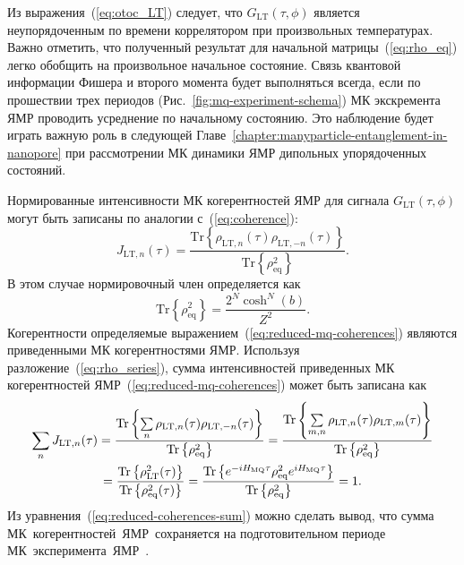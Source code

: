 %
Из выражения~(\ref{eq:otoc_LT}) следует,
что $G_\mathrm{LT}(\tau, \phi)$ является неупорядоченным по времени коррелятором при произвольных температурах.
Важно отметить,
что полученный результат для начальной матрицы~(\ref{eq:rho_eq}) легко обобщить
на произвольное начальное состояние.
Связь квантовой информации Фишера и второго момента будет выполняться всегда,
если по прошествии трех периодов (Рис.~\ref{fig:mq-experiment-schema}) МК экскремента ЯМР
проводить усреднение по начальному состоянию.
Это наблюдение будет играть важную роль в следующей Главе~\ref{chapter:manyparticle-entanglement-in-nanopore}
при рассмотрении МК динамики ЯМР дипольных упорядоченных состояний.

Нормированные интенсивности МК когерентностей ЯМР для сигнала $G_\mathrm{LT}(\tau, \phi)$
могут быть записаны по аналогии с~(\ref{eq:coherence}):
%
\begin{equation}\label{eq:reduced-mq-coherences}
    J_{\mathrm{LT}, n}(\tau) =
    \frac{\mathrm{Tr} \left\{
        \rho_{\mathrm{LT},n}(\tau)
        \rho_{\mathrm{LT}, -n}(\tau)
    \right\}}
    {\mathrm{Tr}\left\{\rho^2_\mathrm{eq}\right\}}.
\end{equation}
%
В этом случае нормировочный член определяется как
%
\begin{equation}\label{eq:j_lt_norm}
  \mathrm{Tr}\left\{\rho^2_\mathrm{eq}\right\} =
    \frac{2^N \cosh^N(b)}{Z^2}.
\end{equation}
Когерентности определяемые выражением~(\ref{eq:reduced-mq-coherences})
являются приведенными МК когерентностями ЯМР.
%
Используя разложение~(\ref{eq:rho_series}),
сумма интенсивностей приведенных МК когерентностей ЯМР~(\ref{eq:reduced-mq-coherences}) может быть записана как
%
\begin{multline}\label{eq:reduced-coherences-sum}
  \sum\limits_{n} J_{\mathrm{LT}, n}(\tau)
  = \dfrac{
    \mathrm{Tr} \left\{ 
      \sum\limits_{n}
      \rho_{\mathrm{LT}, n}(\tau)
      \rho_{\mathrm{LT},-n}(\tau) \right\}
    }{
    \mathrm{Tr} \left\{ \rho^2_\mathrm{eq}  \right\}
  }
  = \dfrac{
    \mathrm{Tr} \left\{ 
      \sum\limits_{m,n}
      \rho_{\mathrm{LT}, n}(\tau)
      \rho_{\mathrm{LT}, m}(\tau)
     \right\}}{
    \mathrm{Tr} \left\{ \rho^2_\mathrm{eq} \right\}
  }
  \\
  = \dfrac{
    \mathrm{Tr} \left\{ \rho_\mathrm{LT}^2(\tau) \right\}
  }{
    \mathrm{Tr} \left\{ \rho^2_\mathrm{eq}(\tau) \right\}
  }
  = \dfrac{
    \mathrm{Tr} \left\{ 
      e^{-i H_\mathrm{MQ} \tau}
      \rho^{2}_\mathrm{eq}
      e^{i H_\mathrm{MQ} \tau}
     \right\}
  }{
    \mathrm{Tr} \left\{  \rho^2_\mathrm{eq} \right\}
  }
  = 1.
\end{multline}
%
Из уравнения~(\ref{eq:reduced-coherences-sum}) можно сделать вывод, что сумма МК~когерентностей~ЯМР~сохраняется на подготовительном периоде МК~эксперимента~ЯМР~\cite{Baum1985}.


